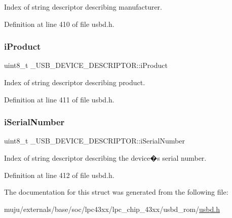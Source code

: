 Index of string descriptor describing manufacturer. 

Definition at line 410 of file usbd.\+h.

\mbox{\label{struct___u_s_b___d_e_v_i_c_e___d_e_s_c_r_i_p_t_o_r_a9708cc7afcfc5cdc57a153b9a750dc16}} 
\subsubsection{\texorpdfstring{i\+Product}{iProduct}}
{\footnotesize\ttfamily uint8\+\_\+t \+\_\+\+U\+S\+B\+\_\+\+D\+E\+V\+I\+C\+E\+\_\+\+D\+E\+S\+C\+R\+I\+P\+T\+O\+R\+::i\+Product}

Index of string descriptor describing product. 

Definition at line 411 of file usbd.\+h.

\mbox{\label{struct___u_s_b___d_e_v_i_c_e___d_e_s_c_r_i_p_t_o_r_a54d859d8539d33e1534cf908503c0f13}} 
\subsubsection{\texorpdfstring{i\+Serial\+Number}{iSerialNumber}}
{\footnotesize\ttfamily uint8\+\_\+t \+\_\+\+U\+S\+B\+\_\+\+D\+E\+V\+I\+C\+E\+\_\+\+D\+E\+S\+C\+R\+I\+P\+T\+O\+R\+::i\+Serial\+Number}

Index of string descriptor describing the device�s serial number. 

Definition at line 412 of file usbd.\+h.



The documentation for this struct was generated from the following file\+:\begin{DoxyCompactItemize}
\item 
muju/externals/base/soc/lpc43xx/lpc\+\_\+chip\+\_\+43xx/usbd\+\_\+rom/\hyperlink{usbd_8h}{usbd.\+h}\end{DoxyCompactItemize}
